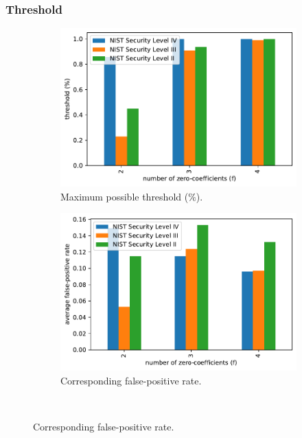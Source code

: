\documentclass[a4paper,titlepage]{article}
\begin{document}
\subsubsection{Threshold}
\label{sec:evalthreshold}

\begin{figure}%
	\centering%
	\begin{subfigure}{.5\textwidth}%
		\centering%
		\includegraphics[width=.95\linewidth]{plots/dilithium_threshold_percent}%
		\caption{Maximum possible threshold ($\%$).}%
		\label{fig:dilithiumthreshold}%
	\end{subfigure}%
	\begin{subfigure}{.5\textwidth}%
		\centering%
		\includegraphics[width=.95\linewidth]{plots/dilithium_threshold_fpr}%
		\caption{Corresponding false-positive rate.\phantom{}}%
		\label{fig:dilithiumthresholdfpr}%
	\end{subfigure}\\\vspace{1em}%

\end{figure}
\end{document}
